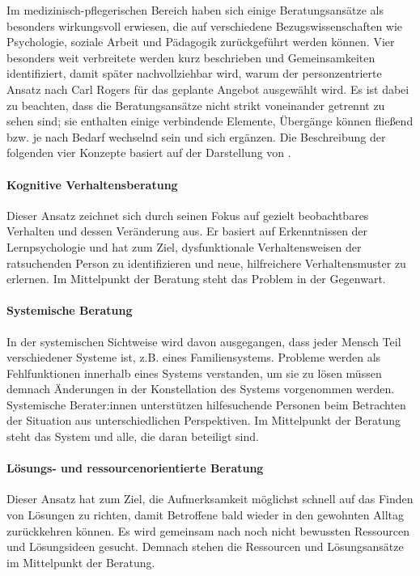 \documentclass[
  twoside,
  parskip=half-,
]{scrreprt}
\begin{document}
Im medizinisch-pflegerischen Bereich haben sich einige Beratungsansätze als besonders wirkungsvoll erwiesen, die auf verschiedene Bezugswissenschaften wie Psychologie, soziale Arbeit und Pädagogik zurückgeführt werden können. Vier besonders weit verbreitete werden kurz beschrieben und Gemeinsamkeiten identifiziert, damit später nachvollziehbar wird, warum der personzentrierte Ansatz nach Carl Rogers für das geplante Angebot ausgewählt wird. Es ist dabei zu beachten, dass die Beratungsansätze nicht strikt voneinander getrennt zu sehen sind; sie enthalten einige verbindende Elemente, Übergänge können fließend bzw. je nach Bedarf wechselnd sein und sich ergänzen. Die Beschreibung der folgenden vier Konzepte basiert auf der Darstellung von \textcite[Kap. 8]{hacker2021}.

\paragraph{Kognitive Verhaltensberatung}

Dieser Ansatz zeichnet sich durch seinen Fokus auf gezielt beobachtbares Verhalten und dessen Veränderung aus. Er basiert auf Erkenntnissen der Lernpsychologie und hat zum Ziel, dysfunktionale Verhaltensweisen der ratsuchenden Person zu identifizieren und neue, hilfreichere Verhaltensmuster zu erlernen. Im Mittelpunkt der Beratung steht das Problem in der Gegenwart.

\paragraph{Systemische Beratung}

In der systemischen Sichtweise wird davon ausgegangen, dass jeder Mensch Teil verschiedener Systeme ist, z.B. eines Familiensystems. Probleme werden als Fehlfunktionen innerhalb eines Systems verstanden, um sie zu lösen müssen demnach Änderungen in der Konstellation des Systems vorgenommen werden. Systemische Berater:innen unterstützen hilfesuchende Personen beim Betrachten der Situation aus unterschiedlichen Perspektiven. Im Mittelpunkt der Beratung steht das System und alle, die daran beteiligt sind.

\paragraph{Lösungs- und ressourcenorientierte Beratung}

Dieser Ansatz hat zum Ziel, die Aufmerksamkeit möglichst schnell auf das Finden von Lösungen zu richten, damit Betroffene bald wieder in den gewohnten Alltag zurückkehren können. Es wird gemeinsam nach noch nicht bewussten Ressourcen und Lösungsideen gesucht. Demnach stehen die Ressourcen und Lösungsansätze im Mittelpunkt der Beratung.
\end{document}
